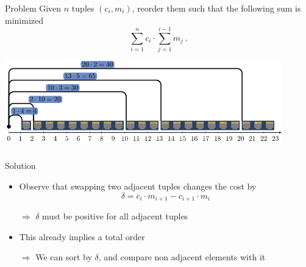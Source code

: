 \begin{frame}
    \frametitle{\problemtitle}
    \begin{block}{Problem}
    	Given $n$ tuples $(c_i,m_i)$, reorder them such that the following sum is minimized
    	$$\sum_{i=1}^{n} c_i\cdot \sum_{j=1}^{i-1}m_j~.$$
    \end{block}
	\bigskip
	\centering
	\includegraphics[width=0.9\textwidth]{sample}
\end{frame}

\begin{frame}
	\frametitle{\problemtitle}
	\begin{block}{Solution}
		\begin{itemize}
			\item Observe that swapping two adjacent tuples changes the cost by
			$$\delta=c_{i}\cdot m_{i+1}-c_{i+1}\cdot m_i$$
			\item[$\Rightarrow$] $\delta$ must be positive for all adjacent tuples
			\pause
			\item This already implies a total order
			\item[$\Rightarrow$] We can sort by $\delta$, and compare non adjacent elements with it
		\end{itemize}
	\end{block}
\end{frame}
